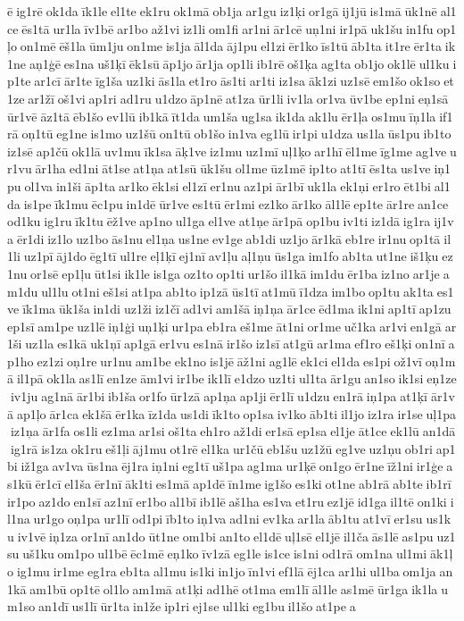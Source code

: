 ē ig1rē ok1da īk1le el1te ek1ru ok1mā ob1ja ar1gu iz1ķi or1gā ij1jū is1mā ūk1nē al1ce ēs1tā ur1la īv1bē ar1bo až1vi iz1li om1fi ar1ni ār1cē uņ1ni ir1pā uk1šu in1fu op1ļo on1mē ēš1la ūm1ju on1me is1ja āl1da āj1pu el1zi ēr1ko īs1tū āb1ta it1re ēr1ta ik1ne aņ1ģē es1na uš1ķī ēk1sū āp1jo ār1ja op1li ib1rē oš1ķa ag1ta ob1jo ok1lē ul1ku ip1te ar1cī ār1te īg1ša uz1ki ās1la et1ro ās1ti ar1ti iz1sa āk1zi uz1sē em1šo ok1so et1ze ar1žī oš1vi ap1ri ad1ru u1dzo āp1nē at1za ūr1li iv1la or1va ūv1be ep1ni eņ1sā ūr1vē āz1tā ēb1šo ev1lū ib1kā īt1da um1ša ug1sa ik1da ak1lu ēr1ļa os1mu īņ1la if1rā oņ1tū eg1ne is1mo uz1šū on1tū ob1šo in1va eg1lū ir1pi u1dza us1la ūs1pu ib1to iz1sē ap1čū ok1lā uv1mu īk1sa āķ1ve iz1mu uz1mī uļ1ķo ar1hī ēl1me īg1me ag1ve ur1vu ār1ha ed1ni āt1se at1ņa at1sū ūk1šu ol1me ūz1mē ip1to at1tī ēs1ta us1ve iņ1pu ol1va in1ši āp1ta ar1ko ēk1si el1zī er1nu az1pi ār1bī uk1la ek1ņi er1ro ēt1bi al1da is1pe īk1mu ēc1pu in1dē ūr1ve es1tū ēr1mi ez1ko ār1ko āl1lē ep1te ār1re an1ce od1ku ig1ru īk1tu ēž1ve ap1no ul1ga el1ve at1ņe ār1pā op1bu iv1ti iz1dā ig1ra ij1va ēr1di iz1lo uz1bo ās1nu el1ņa us1ne ev1ge ab1di uz1jo ār1kā eb1re ir1nu op1tā il1li uz1pī āj1do ēg1tī ul1re eļ1ķī ej1nī av1ļu aļ1ņu ūs1ga im1fo ab1ta ut1ne iš1ķu ez1nu or1sē ep1ļu ūt1si ik1le is1ga oz1to op1ti ur1šo il1kā im1du ēr1ba iz1no ar1je am1du ul1lu ot1ni eš1si at1pa ab1to ip1zā ūs1tī at1mū ī1dza im1bo op1tu ak1ta es1ve īk1ma ūk1ša in1di uz1ži iz1čī ad1vi am1šā iņ1ņa ār1ce ēd1ma ik1ni ap1tī ap1zu ep1sī am1pe uz1lē iņ1ģi uņ1ķi ur1pa eb1ra eš1me āt1ni or1me uč1ka ar1vi en1gā ar1ši uz1la es1kā uk1ņī ap1gā er1vu es1nā ir1šo iz1sī at1gū ar1ma ef1ro eš1ķi on1nī ap1ho ez1zi oņ1re ur1nu am1be ek1no is1jē āž1ni ag1lē ek1ci el1da es1pi ož1vī oņ1mā il1pā ok1la as1lī en1ze ām1vi ir1be ik1lī e1dzo uz1ti ul1ta ār1gu an1so ik1si eņ1ze iv1ju ag1nā ār1bi ib1ša or1fo ūr1zā ap1ņa ap1ji ēr1lī u1dzu en1rā iņ1pa at1ķī ār1vā ap1ļo ār1ca ek1šā ēr1ka īz1da us1di īk1to op1sa iv1ko āb1ti il1jo iz1ra ir1se uļ1pa iz1ņa ār1fa os1li ez1ma ar1si oš1ta eh1ro až1di er1sā ep1sa el1je āt1ce ek1lū an1dā ig1rā is1za ok1ru eš1ļi āj1mu ot1rē el1ka ur1čū eb1šu uz1žū eg1ve uz1ņu ob1ri ap1bi iž1ga av1va ūs1na ēj1ra iņ1ni eg1tī uš1pa ag1ma ur1ķē on1go ēr1ne īž1ni ir1ģe as1kū ēr1cī el1ša ēr1nī āk1ti es1mā ap1dē īn1me ig1šo es1ki ot1ne ab1rā ab1te ib1rī ir1po az1do en1sī az1nī er1bo al1bī ib1lē aš1ha es1va et1ru ez1jē id1ga il1tē on1ki il1na ur1go oņ1pa ur1lī od1pi īb1to iņ1va ad1ni ev1ka ar1la āb1tu at1vī er1su us1ku iv1vē iņ1za or1nī an1do ūt1ne om1bi an1to el1dē uļ1sē el1jē il1ča ās1lē as1pu uz1su uš1ku om1po ul1bē ēc1mē eņ1ko īv1zā eg1le is1ce is1ni od1rā om1na ul1mi āk1ļo ig1mu ir1me eg1ra eb1ta al1mu is1ki in1jo īn1vi ef1lā ēj1ca ar1hi ul1ba om1ja an1kā am1bū op1tē ol1lo am1mā at1ķi ad1hē ot1ma em1lī āl1le as1mē ūr1ga ik1la um1so an1dī us1lī ūr1ta in1že ip1ri ej1se ul1ki eg1bu il1šo at1pe a